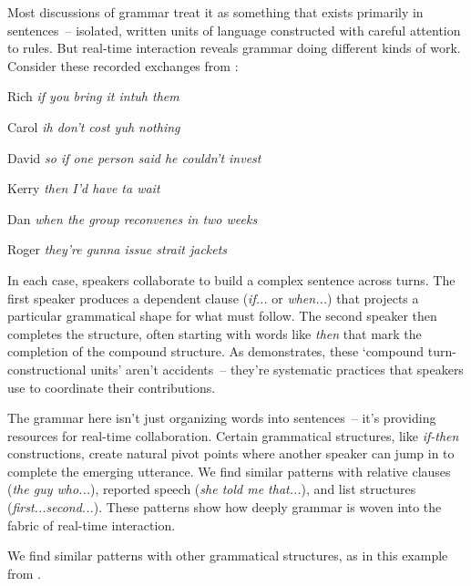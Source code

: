 Most discussions of grammar treat it as something that exists primarily in sentences~-- isolated, written units of language constructed with careful attention to rules. But real-time interaction reveals grammar doing different kinds of work. Consider these recorded exchanges from \citet{lerner1991}:

\ea
  \ea
  \begin{dialogue}
      \item[Rich] \textit{if you bring it intuh them}
      \item[Carol] \textit{ih don't cost yuh nothing}
  \end{dialogue}
  \ex
  \begin{dialogue}
      \item[David] \textit{so if one person said he couldn't invest}
      \item[Kerry] \textit{then I'd have ta wait}
  \end{dialogue}
  \ex
  \begin{dialogue}
      \item[Dan] \textit{when the group reconvenes in two weeks}
      \item[Roger] \textit{they're gunna issue strait jackets}
  \end{dialogue}
  \z
\z

In each case, speakers collaborate to build a complex sentence across turns. The first speaker produces a dependent clause (\textit{if...} or \textit{when...}) that projects a particular grammatical shape for what must follow. The second speaker then completes the structure, often starting with words like \textit{then} that mark the completion of the compound structure. As \citet{lerner1991} demonstrates, these `compound turn-constructional units' aren't accidents~-- they're systematic practices that speakers use to coordinate their contributions.

The grammar here isn't just organizing words into sentences~-- it's providing resources for real-time collaboration. Certain grammatical structures, like \textit{if-then} constructions, create natural pivot points where another speaker can jump in to complete the emerging utterance. We find similar patterns with relative clauses (\textit{the guy who...}), reported speech (\textit{she told me that...}), and list structures (\textit{first...second...}). These patterns show how deeply grammar is woven into the fabric of real-time interaction.

We find similar patterns with other grammatical structures, as in this example from \citet{szczepek2000}.

